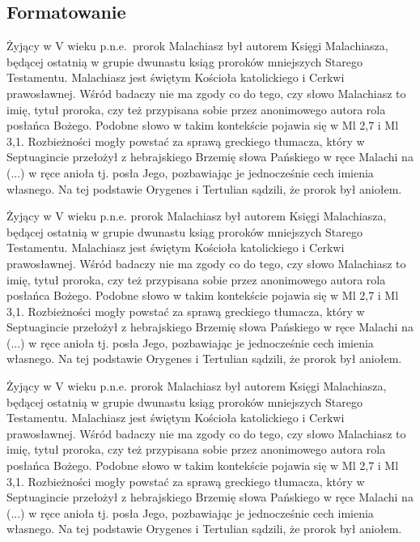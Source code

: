 \documentclass[12pt,a4paper]{article}
\begin{document}
\subsection{Formatowanie}

Żyjący w V wieku p.n.e.~prorok Malachiasz był autorem Księgi Malachiasza, będącej
ostatnią w grupie dwunastu ksiąg proroków mniejszych Starego Testamentu. Malachiasz jest
świętym Kościoła katolickiego i Cerkwi prawosławnej. Wśród badaczy nie ma zgody co do
tego, czy słowo Malachiasz to imię, tytuł proroka, czy też przypisana sobie przez
anonimowego autora rola posłańca Bożego. Podobne słowo w takim kontekście pojawia
się w Ml 2,7 i Ml 3,1. Rozbieżności mogły powstać za sprawą greckiego tłumacza, który
w Septuagincie przełożył z hebrajskiego Brzemię słowa Pańskiego w ręce Malachi na
(...) w ręce anioła tj. posła Jego, pozbawiając je jednocześnie cech
imienia własnego. Na tej podstawie Orygenes i Tertulian sądzili, że prorok był aniołem.

\begin{center}
Żyjący w V wieku p.n.e. prorok Malachiasz był autorem Księgi Malachiasza, będącej
ostatnią w grupie dwunastu ksiąg proroków mniejszych Starego Testamentu. Malachiasz jest
świętym Kościoła katolickiego i Cerkwi prawosławnej. Wśród badaczy nie ma zgody co do
tego, czy słowo Malachiasz to imię, tytuł proroka, czy też przypisana sobie przez
anonimowego autora rola posłańca Bożego. Podobne słowo w takim kontekście pojawia
się w Ml 2,7 i Ml 3,1. Rozbieżności mogły powstać za sprawą greckiego tłumacza, który
w Septuagincie przełożył z hebrajskiego Brzemię słowa Pańskiego w ręce Malachi na
(...) w ręce anioła tj. posła Jego, pozbawiając je jednocześnie cech
imienia własnego. Na tej podstawie Orygenes i Tertulian sądzili, że prorok był aniołem.
\end{center}

\begin{flushleft}
Żyjący w V wieku p.n.e. prorok Malachiasz był autorem Księgi Malachiasza, będącej
ostatnią w grupie dwunastu ksiąg proroków mniejszych Starego Testamentu. Malachiasz jest
świętym Kościoła katolickiego i Cerkwi prawosławnej. Wśród badaczy nie ma zgody co do
tego, czy słowo Malachiasz to imię, tytuł proroka, czy też przypisana sobie przez
anonimowego autora rola posłańca Bożego. Podobne słowo w takim kontekście pojawia
się w Ml 2,7 i Ml 3,1. Rozbieżności mogły powstać za sprawą greckiego tłumacza, który
w Septuagincie przełożył z hebrajskiego Brzemię słowa Pańskiego w ręce Malachi na
(...) w ręce anioła tj. posła Jego, pozbawiając je jednocześnie cech
imienia własnego. Na tej podstawie Orygenes i Tertulian sądzili, że prorok był aniołem.
\end{flushleft}
\end{document}
